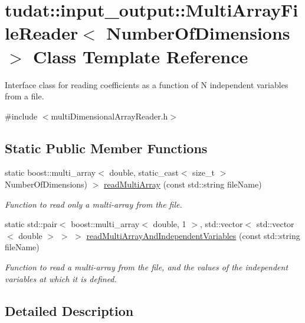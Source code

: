 \hypertarget{classtudat_1_1input__output_1_1MultiArrayFileReader}{}\section{tudat\+:\+:input\+\_\+output\+:\+:Multi\+Array\+File\+Reader$<$ Number\+Of\+Dimensions $>$ Class Template Reference}
\label{classtudat_1_1input__output_1_1MultiArrayFileReader}


Interface class for reading coefficients as a function of N independent variables from a file.  




{\ttfamily \#include $<$multi\+Dimensional\+Array\+Reader.\+h$>$}

\subsection*{Static Public Member Functions}
\begin{DoxyCompactItemize}
\item 
static boost\+::multi\+\_\+array$<$ double, static\+\_\+cast$<$ size\+\_\+t $>$ Number\+Of\+Dimensions) $>$ \hyperlink{classtudat_1_1input__output_1_1MultiArrayFileReader_a54c5d8add5a13c0ff67246d44806d114}{read\+Multi\+Array} (const std\+::string file\+Name)
\begin{DoxyCompactList}\small\item\em Function to read only a multi-\/array from the file. \end{DoxyCompactList}\item 
static std\+::pair$<$ boost\+::multi\+\_\+array$<$ double, 1 $>$, std\+::vector$<$ std\+::vector$<$ double $>$ $>$ $>$ \hyperlink{classtudat_1_1input__output_1_1MultiArrayFileReader_a389e47eb23ab362e18473a369068e688}{read\+Multi\+Array\+And\+Independent\+Variables} (const std\+::string file\+Name)
\begin{DoxyCompactList}\small\item\em Function to read a multi-\/array from the file, and the values of the independent variables at which it is defined. \end{DoxyCompactList}\end{DoxyCompactItemize}


\subsection{Detailed Description}
